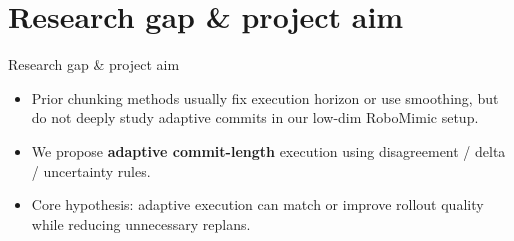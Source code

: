 \documentclass[aspectratio=169]{beamer}
\begin{document}
\section{Research gap \& project aim}
\begin{frame}{Research gap \& project aim}
    \begin{itemize}
        \item Prior chunking methods usually fix execution horizon or use smoothing, but do not deeply study adaptive commits in our low-dim RoboMimic setup.
        \item We propose \textbf{adaptive commit-length} execution using disagreement / delta / uncertainty rules.
        \item Core hypothesis: adaptive execution can match or improve rollout quality while reducing unnecessary replans.
    \end{itemize}
\end{frame}
\end{document}
